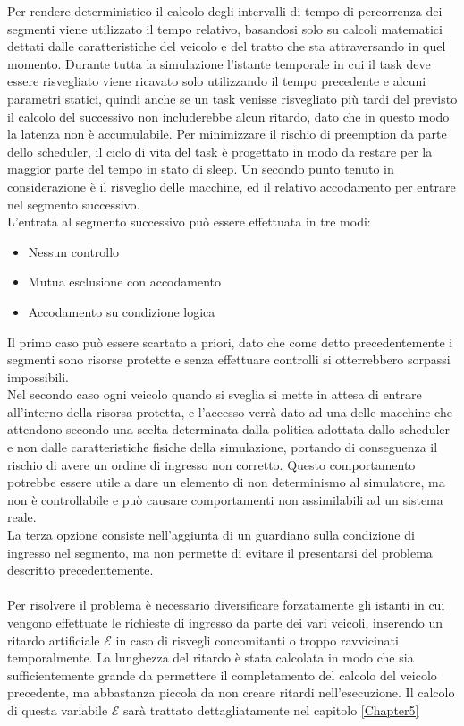Per rendere deterministico il calcolo degli intervalli di tempo di percorrenza dei segmenti viene utilizzato il tempo relativo, basandosi solo su calcoli matematici dettati dalle caratteristiche del veicolo e del tratto che sta attraversando in quel momento. Durante tutta la simulazione l’istante temporale in cui il task deve essere risvegliato viene ricavato solo utilizzando il tempo precedente e alcuni parametri statici, quindi anche se un task venisse risvegliato più tardi del previsto il calcolo del successivo non includerebbe alcun ritardo, dato che in questo modo la latenza non è accumulabile.
Per minimizzare il rischio di preemption da parte dello scheduler, il ciclo di vita del task è progettato in modo da restare per la maggior parte del tempo in stato di sleep.
Un secondo punto tenuto in considerazione è il risveglio delle macchine, ed il relativo accodamento per entrare nel segmento successivo.
\\
L'entrata al segmento successivo può essere effettuata in tre modi:
\begin{itemize}
 \item Nessun controllo
 \item Mutua esclusione con accodamento
 \item Accodamento su condizione logica
\end{itemize}
Il primo caso può essere scartato a priori, dato che come detto precedentemente i segmenti sono risorse protette e senza effettuare controlli si otterrebbero sorpassi impossibili.\\
Nel secondo caso ogni veicolo quando si sveglia si mette in attesa di entrare all’interno della risorsa protetta, e l’accesso verrà dato ad una delle macchine che attendono secondo una scelta determinata dalla politica adottata dallo scheduler e non dalle caratteristiche fisiche della simulazione, portando di conseguenza il rischio di avere un ordine di ingresso non corretto. Questo comportamento potrebbe essere utile a dare un elemento di non determinismo al simulatore, ma non è controllabile e può causare comportamenti non assimilabili ad un sistema reale. \\
La terza opzione consiste nell'aggiunta di un guardiano sulla condizione di ingresso nel segmento, ma non permette di evitare il presentarsi del problema descritto precedentemente.
\\ \\
Per risolvere il problema è necessario diversificare forzatamente gli istanti in cui vengono effettuate le richieste di ingresso da parte dei vari veicoli, inserendo un ritardo artificiale $\mathcal{E}$ in caso di risvegli concomitanti o troppo ravvicinati temporalmente. La lunghezza del ritardo è stata calcolata in modo che sia sufficientemente grande da permettere il completamento del calcolo del veicolo precedente, ma abbastanza piccola da non creare ritardi nell'esecuzione. Il calcolo di questa variabile $\mathcal{E}$ sarà trattato dettagliatamente nel capitolo \ref{Chapter5}

